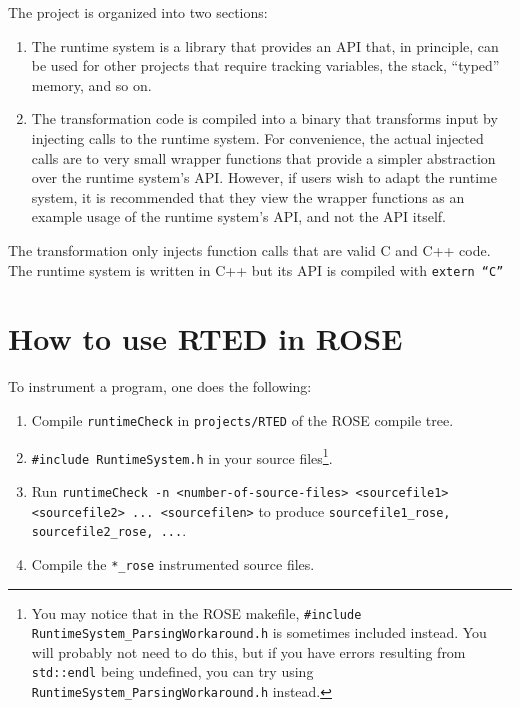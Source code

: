 The project is organized into two sections:

\begin{enumerate}

    \item The runtime system is a library that provides an API that, in
    principle, can be used for other projects that require tracking variables,
    the stack, “typed” memory, and so on.

    \item The transformation code is compiled into a binary that transforms
    input by injecting calls to the runtime system.  For convenience, the actual
    injected calls are to very small wrapper functions that provide a simpler
    abstraction over the runtime system's API.  However, if users wish to adapt
    the runtime system, it is recommended that they view the wrapper functions
    as an example usage of the runtime system's API, and not the API itself.  
    
\end{enumerate}

The transformation only injects function calls that are valid C and C++ code.
The runtime system is written in C++ but its API is compiled with
\texttt{extern “C”}



\section{How to use RTED in ROSE}%

To instrument a program, one does the following:

\begin{enumerate}

    \item Compile \texttt{runtimeCheck} in \texttt{projects/RTED} of the ROSE
    compile tree.

    \item \texttt{\#include RuntimeSystem.h} in your source files\footnote{You
    may notice that in the ROSE makefile, \texttt{\#include
    RuntimeSystem\_ParsingWorkaround.h} is sometimes included instead.  You will
    probably not need to do this, but if you have errors resulting from
    \texttt{std::endl} being undefined, you can try using
    \texttt{RuntimeSystem\_ParsingWorkaround.h} instead.}.

    \item Run \texttt{runtimeCheck -n <number-of-source-files> <sourcefile1>
    <sourcefile2> ... <sourcefilen>} to produce \texttt{sourcefile1\_rose,
    sourcefile2\_rose, ...}.

    \item Compile the \texttt{*\_rose} instrumented source files.

\end{enumerate}

